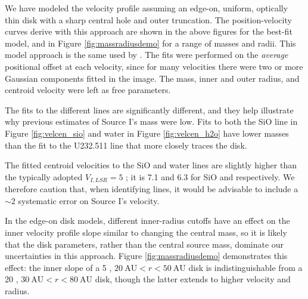 \documentclass[twocolumn]{aastex61}
\begin{document}


We have modeled the velocity profile assuming an edge-on, uniform, optically
thin disk with a sharp central hole and outer truncation.  The
position-velocity curves derive with this approach are shown in the above
figures for the best-fit model, and in Figure \ref{fig:massradiusdemo}
for a range of masses and radii.
This model approach is the same used by
\citet{Plambeck2016a}.
The fits were performed on the \emph{average} positional offset at each
velocity, since for many velocities there were two or more Gaussian
components fitted in the image.  The mass, inner and outer radius, and
centroid velocity were left as free parameters.

The fits to the different lines are significantly different, and they 
help illustrate why previous estimates of Source I's mass were low.
Fits to both the SiO line in Figure \ref{fig:velcen_sio} and water
in Figure \ref{fig:velcen_h2o} have lower masses than the fit to
the U232.511 line that more closely traces the disk.

The fitted centroid velocities to the SiO and water lines are slightly higher
than the typically adopted $V_{I,LSR}=5$ \kms; it is 7.1 and 6.3 \kms for SiO
and \water respectively.  We therefore caution that, when identifying lines, it
would be advisable to include a $\sim2$ \kms systematic error on Source I's
velocity.




In the edge-on disk models, different inner-radius cutoffs have an effect on
the inner velocity profile slope similar to changing the central mass, so it is
likely that the disk parameters, rather than the central source mass, dominate
our uncertainties in this approach.  
Figure \ref{fig:massradiusdemo} demonstrates this effect: the inner slope of
a 5 \msun, $20~\mathrm{AU} < r < 50~\mathrm{AU}$ disk is indistinguishable
from a 20 \msun , $30~\mathrm{AU} < r < 80~\mathrm{AU}$ disk, though the latter
extends to higher velocity and radius.
\end{document}
